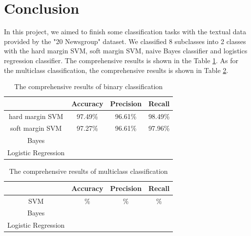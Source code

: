 \documentclass{article}
\begin{document}
\section{Conclusion}
In this project, we aimed to finish some classification tasks with the textual data provided by the "20 Newsgroup" dataset. We classified 8 subclasses into 2 classes with the hard margin SVM, soft margin SVM, naive Bayes classifier and logistics regression classifier. The comprehensive results is shown in the Table \ref{tb:binaryresults}. As for the multiclass classification, the comprehensive results is shown in Table \ref{tb:multiresults}.
\begin{table}
\begin{center}
\caption{The comprehensive results of binary classification}
\label{tb:binaryresults}
\begin{tabular}{|c|c|c|c|}
\hline
& Accuracy& Precision& Recall\\
\hline
hard margin SVM& 97.49\%&96.61\% &98.49\% \\
\hline
soft margin SVM& 97.27\%&96.61\% &97.96\% \\
\hline 	
Bayes& & & \\
\hline
Logistic Regression& & &\\
\hline
\end{tabular}
\end{center}
\end{table}

\begin{table}
\begin{center}
\caption{The comprehensive results of multiclass classification}
\label{tb:multiresults}
\begin{tabular}{|c|c|c|c|}
\hline
& Accuracy& Precision& Recall\\
\hline
SVM& \%&\% &\% \\
\hline
Bayes& & & \\
\hline
Logistic Regression& & &\\
\hline
\end{tabular}
\end{center}
\end{table}
\end{document}
